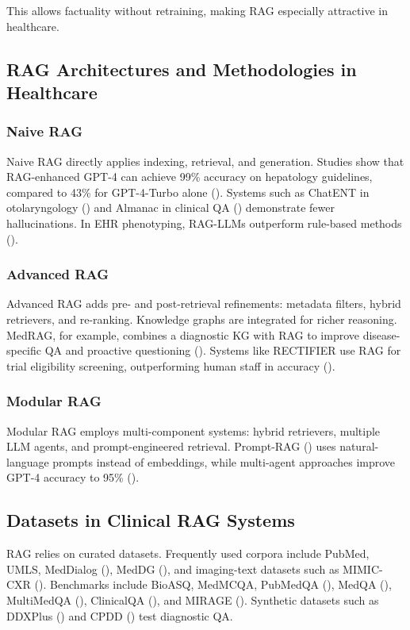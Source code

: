 This allows factuality without retraining, making RAG especially attractive in healthcare.

\subsection{RAG Architectures and Methodologies in Healthcare}

\subsubsection{Naive RAG}
Naive RAG directly applies indexing, retrieval, and generation. Studies show that RAG-enhanced GPT-4 can achieve 99\% accuracy on hepatology guidelines, compared to 43\% for GPT-4-Turbo alone (\citep{li2024liversa}). Systems such as ChatENT in otolaryngology (\citep{zhang2024chatent}) and Almanac in clinical QA (\citep{singhal2023almanac}) demonstrate fewer hallucinations. In EHR phenotyping, RAG-LLMs outperform rule-based methods (\citep{wu2024ragphenotype}).

\subsubsection{Advanced RAG}
Advanced RAG adds pre- and post-retrieval refinements: metadata filters, hybrid retrievers, and re-ranking. Knowledge graphs are integrated for richer reasoning. MedRAG, for example, combines a diagnostic KG with RAG to improve disease-specific QA and proactive questioning (\citep{zhao2025medrag}). Systems like RECTIFIER use RAG for trial eligibility screening, outperforming human staff in accuracy (\citep{wang2024rectifier}).

\subsubsection{Modular RAG}
Modular RAG employs multi-component systems: hybrid retrievers, multiple LLM agents, and prompt-engineered retrieval. Prompt-RAG (\citep{kim2024promptrag}) uses natural-language prompts instead of embeddings, while multi-agent approaches improve GPT-4 accuracy to 95\% (\citep{sun2025agenticrag}).

\subsection{Datasets in Clinical RAG Systems}

RAG relies on curated datasets. Frequently used corpora include PubMed, UMLS, MedDialog (\citep{chen2020meddialog}), MedDG (\citep{li2020meddg}), and imaging-text datasets such as MIMIC-CXR (\citep{johnson2019mimiccxr}). Benchmarks include BioASQ, MedMCQA, PubMedQA (\citep{jin2019pubmedqa}), MedQA (\citep{jin2021medqa}), MultiMedQA (\citep{singhal2023multimedqa}), ClinicalQA (\citep{abacha2021nlmclinicalqa}), and MIRAGE (\citep{zhu2023mirage}). Synthetic datasets such as DDXPlus (\citep{liu2023ddxplus}) and CPDD (\citep{zhao2025medrag}) test diagnostic QA.

